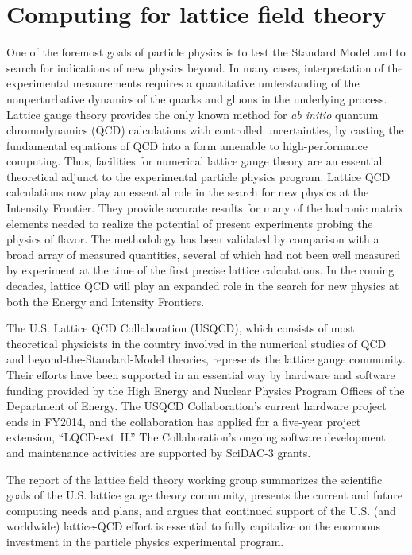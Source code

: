  
\section{Computing for lattice field theory}
\label{chap:LFT}


One of the foremost goals of particle physics is to test the Standard Model
and to search for indications of new physics beyond. In
many cases, interpretation of the experimental measurements requires a
quantitative understanding of the nonperturbative dynamics of the quarks and
gluons in the underlying process.  Lattice gauge theory provides the only
known method for \emph{ab initio} quantum chromodynamics (QCD) calculations
with controlled uncertainties, by casting the fundamental equations of QCD
into a form amenable to high-performance computing.  Thus, facilities for
numerical lattice gauge theory are an essential theoretical adjunct to the
experimental particle physics program.  Lattice QCD calculations now play
an essential role in the search for new physics at the Intensity Frontier.
They provide accurate results for many of the hadronic matrix elements needed
to realize the potential of present experiments probing the physics of
flavor. The methodology has been validated by comparison with a broad array of
measured quantities, several of which had not been well measured by experiment
at the time of the first precise lattice
calculations.  In the coming decades, lattice QCD will
play an expanded role in the search for new physics at both the Energy and
Intensity Frontiers.

The U.S. Lattice QCD Collaboration (USQCD), which consists of
most theoretical physicists in the country involved in the numerical studies
of QCD and beyond-the-Standard-Model theories, represents the lattice gauge
community.  Their efforts have been supported in an essential way by hardware
and software funding provided by the High Energy and Nuclear Physics Program
Offices of the Department of Energy.  The USQCD Collaboration's current
hardware project ends in FY2014, and the collaboration has applied for a
five-year project extension, ``LQCD-ext~II.''  The Collaboration's ongoing
software development and maintenance activities are supported by SciDAC-3
grants.

The report of the lattice field theory working group \cite{Blum:2013mhx}
summarizes the scientific
goals of the U.S. lattice gauge theory community, presents the current and
future computing needs and plans, and argues that continued support of the
U.S. (and worldwide) lattice-QCD effort is essential to fully capitalize on
the enormous investment in the particle physics experimental program.

